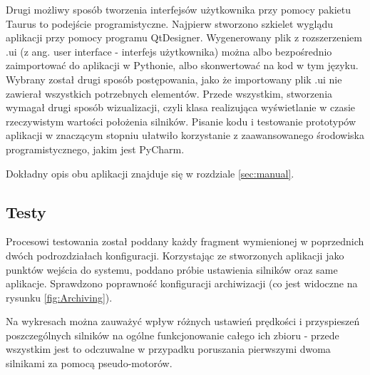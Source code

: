 Drugi możliwy sposób tworzenia interfejsów użytkownika przy pomocy pakietu Taurus to podejście programistyczne. Najpierw stworzono szkielet wyglądu aplikacji przy pomocy programu QtDesigner. Wygenerowany plik z rozszerzeniem .ui (z ang. user interface - interfejs użytkownika) można albo bezpośrednio zaimportować do aplikacji w Pythonie, albo skonwertować na kod w tym języku. Wybrany został drugi sposób postępowania, jako że importowany plik .ui nie zawierał wszystkich potrzebnych elementów. Przede wszystkim, stworzenia wymagał drugi sposób wizualizacji, czyli klasa realizująca wyświetlanie w czasie rzeczywistym wartości położenia silników. Pisanie kodu i testowanie prototypów aplikacji w znaczącym stopniu ułatwiło korzystanie z zaawansowanego środowiska programistycznego, jakim jest PyCharm.

Dokładny opis obu aplikacji znajduje się w rozdziale \ref{sec:manual}.


\subsection{Testy}
\label{sub:testy}

\quad Procesowi testowania został poddany każdy fragment wymienionej w poprzednich dwóch podrozdziałach konfiguracji. Korzystając ze stworzonych aplikacji jako punktów wejścia do systemu, poddano próbie ustawienia silników oraz same aplikacje. Sprawdzono poprawność konfiguracji archiwizacji (co jest widoczne na rysunku \ref{fig:Archiving}).

Na wykresach można zauważyć wpływ różnych ustawień prędkości i przyspieszeń poszczególnych silników na ogólne funkcjonowanie całego ich zbioru - przede wszystkim jest to odczuwalne w przypadku poruszania pierwszymi dwoma silnikami za pomocą pseudo-motorów.